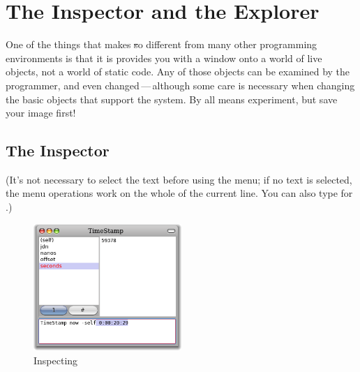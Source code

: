 \documentclass[a4paper,10pt,twoside]{book}
\begin{document}
\section{The Inspector and the Explorer}

One of the things that makes \st so different from many other programming environments is that it is provides you with a window onto a world of live objects, not a world of static code.
Any of those objects can be examined by the programmer, and even changed\,---\,although some care is necessary when changing the basic objects that support the system.  
By all means experiment, but save your image first!

\subsection{The Inspector}

(It's not necessary to select the text before using the menu; if no text is selected, the menu operations work on the whole of the current line.
You can also type  for .)

\begin{figure}[btp]
	\begin{center}
		\includegraphics[width=0.5\textwidth]{inspectTimeNow1}
	\end{center}
	\caption{Inspecting }
\end{figure}
\end{document}
